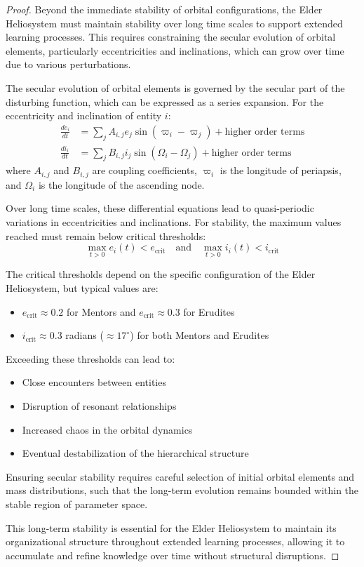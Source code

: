 \begin{proof}
Beyond the immediate stability of orbital configurations, the Elder Heliosystem must maintain stability over long time scales to support extended learning processes. This requires constraining the secular evolution of orbital elements, particularly eccentricities and inclinations, which can grow over time due to various perturbations.

The secular evolution of orbital elements is governed by the secular part of the disturbing function, which can be expressed as a series expansion. For the eccentricity and inclination of entity $i$:
\begin{align}
\frac{de_i}{dt} &= \sum_j A_{i,j} e_j \sin(\varpi_i - \varpi_j) + \text{higher order terms} \\
\frac{di_i}{dt} &= \sum_j B_{i,j} i_j \sin(\Omega_i - \Omega_j) + \text{higher order terms}
\end{align}
where $A_{i,j}$ and $B_{i,j}$ are coupling coefficients, $\varpi_i$ is the longitude of periapsis, and $\Omega_i$ is the longitude of the ascending node.

Over long time scales, these differential equations lead to quasi-periodic variations in eccentricities and inclinations. For stability, the maximum values reached must remain below critical thresholds:
\begin{equation}
\max_{t > 0} e_i(t) < e_{\text{crit}} \quad \text{and} \quad \max_{t > 0} i_i(t) < i_{\text{crit}}
\end{equation}

The critical thresholds depend on the specific configuration of the Elder Heliosystem, but typical values are:
\begin{itemize}
    \item $e_{\text{crit}} \approx 0.2$ for Mentors and $e_{\text{crit}} \approx 0.3$ for Erudites
    \item $i_{\text{crit}} \approx 0.3$ radians ($\approx 17^{\circ}$) for both Mentors and Erudites
\end{itemize}

Exceeding these thresholds can lead to:
\begin{itemize}
    \item Close encounters between entities
    \item Disruption of resonant relationships
    \item Increased chaos in the orbital dynamics
    \item Eventual destabilization of the hierarchical structure
\end{itemize}

Ensuring secular stability requires careful selection of initial orbital elements and mass distributions, such that the long-term evolution remains bounded within the stable region of parameter space.

This long-term stability is essential for the Elder Heliosystem to maintain its organizational structure throughout extended learning processes, allowing it to accumulate and refine knowledge over time without structural disruptions.
\end{proof}

